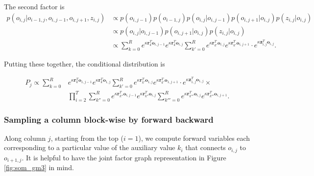 \documentclass[11pt]{article}
\begin{document}
\noindent The second factor is
%
\begin{align*}
p(o_{i,j}|o_{i-1,j},o_{i,j-1},o_{i,j+1},z_{i,j}) &\propto p(o_{i,j-1}) p(o_{i-1,j}) p(o_{i,j}|o_{i,j-1})p(o_{i,j+1}|o_{i,j})p(z_{i,j}|o_{i,j}) \\
&\propto p(o_{i,j}|o_{i,j-1})p(o_{i,j+1}|o_{i,j})p(z_{i,j}|o_{i,j}) \\
&\propto \sum_{k=0}^R e^{\kappa \mathbf{r}_k^T \mathbf{o}_{i,j-1}} e^{\kappa \mathbf{r}_k^T \mathbf{o}_{i,j}}
\sum_{k'=0}^R e^{\kappa \mathbf{r}_{k'}^T \mathbf{o}_{i,j}} e^{\kappa \mathbf{r}_{k'}^T \mathbf{o}_{i,j+1}}
\cdot e^{\kappa \mathbf{z}_{i,j}^T\mathbf{o}_{i,j} }.
\end{align*}

\noindent Putting these together, the conditional distribution is

\begin{align*}
P_j \propto \sum_{k=0}^R &e^{\kappa \mathbf{r}_k^T \mathbf{o}_{1,j-1}} e^{\kappa \mathbf{r}_k^T \mathbf{o}_{1,j}}
\sum_{k'=0}^R e^{\kappa \mathbf{r}_{k'}^T \mathbf{o}_{1,j}} e^{\kappa \mathbf{r}_{k'}^T \mathbf{o}_{1,j+1}}
\cdot e^{\kappa \mathbf{z}_{1,j}^T\mathbf{o}_{1,j} } \times \\
&\prod_{i=2}^T \sum_{k''=0}^R e^{\kappa \mathbf{r}_{k''}^T\mathbf{o}_{i,j-1}} e^{\kappa \mathbf{r}_{k''}^T\mathbf{o}_{i,j}}
\sum_{k'''=0}^R e^{\kappa \mathbf{r}_{k'''}^T\mathbf{o}_{i,j}} e^{\kappa \mathbf{r}_{k'''}^T\mathbf{o}_{i,j+1}}.
\end{align*}

\subsubsection*{Sampling a column block-wise by forward backward}

Along column $j$, starting from the top ($i=1$), we compute forward variables each corresponding to a particular value of the auxiliary value $k_i$ that connects $o_{i,j}$ to $o_{i+1,j}$. It is helpful to have the joint factor graph representation in Figure \ref{fig:som_gm3} in mind.
\end{document}
